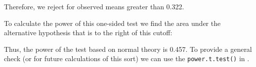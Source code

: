 Therefore, we reject for observed means greater than 0.322.  

To calculate the power of this one-sided test we find the area 
under the alternative hypothesis 
that is to the right of this cutoff:
\begin{knitrout}
\end{knitrout}

Thus, the power of the test based on normal theory is 0.457.
To provide a general check (or for future calculations of this sort) we can use the {\tt power.t.test()} in \R.
\begin{knitrout}
\end{knitrout}



